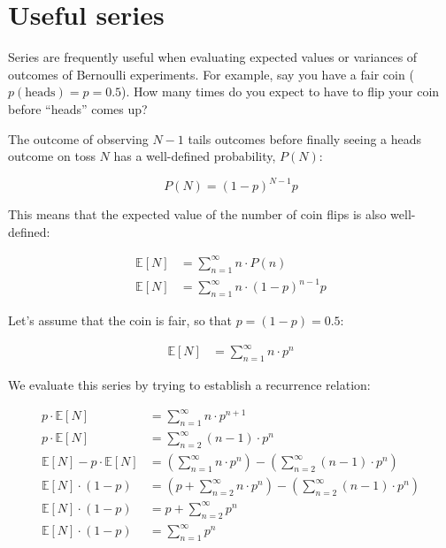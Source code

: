 \section{Useful series}
\label{sec:useful_series}

Series are frequently useful when evaluating expected values or variances
of outcomes of Bernoulli experiments.  For example, say you have a fair coin
($p(\text{heads}) = p = 0.5$).  How many times do you expect to have to flip
your coin before ``heads'' comes up?

The outcome of observing $N-1$ tails outcomes before finally seeing a heads
outcome on toss $N$ has a well-defined probability, $P(N)$:

\begin{equation}
  P(N) = (1-p)^{N-1} p
\end{equation}

This means that the expected value of the number of coin flips is also well-defined:

\begin{align}
  \mathbb{E}[N] &= \sum_{n=1}^{\infty} n \cdot P(n) \\
  \mathbb{E}[N] &= \sum_{n=1}^{\infty} n \cdot (1-p)^{n-1} p
\end{align}

Let's assume that the coin is fair, so that $p = (1-p) = 0.5$:

\begin{align}
  \mathbb{E}[N] &= \sum_{n=1}^{\infty} n \cdot p^{n}
\end{align}

We evaluate this series by trying to establish a recurrence relation:

\begin{align}
  p \cdot \mathbb{E}[N] &= \sum_{n=1}^{\infty} n \cdot p^{n + 1} \\ 
  p \cdot \mathbb{E}[N] &= \sum_{n=2}^{\infty} (n-1) \cdot p^{n} \\ 
   \mathbb{E}[N] - p \cdot \mathbb{E}[N] &= \left(\sum_{n=1}^{\infty} n \cdot p^{n}\right) -  \left(\sum_{n=2}^{\infty} (n-1) \cdot p^{n}\right) \\
   \mathbb{E}[N] \cdot (1 - p) &= \left(p + \sum_{n=2}^{\infty} n \cdot p^{n}\right) -  \left(\sum_{n=2}^{\infty} (n-1) \cdot p^{n}\right) \\
   \mathbb{E}[N] \cdot (1 - p) &= p + \sum_{n=2}^{\infty} p^{n} \\
   \mathbb{E}[N] \cdot (1 - p) &= \sum_{n=1}^{\infty} p^{n}
\end{align}

